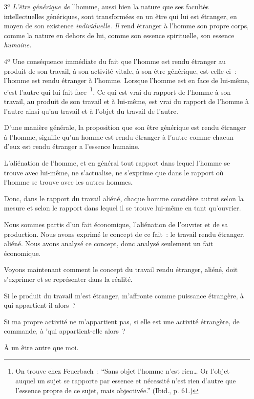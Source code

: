 \documentclass[french,twoside]{book} %
\begin{document}
3º \emph{L’être générique de} l’homme, aussi bien la nature que ses facultés intellectuelles génériques, sont transformées en un être qui lui est étranger, en moyen de son existence \emph{individuelle. Il} rend étranger à l’homme son propre corps, comme la nature en dehors de lui, comme son essence spirituelle, son essence \emph{humaine.}\par
4º Une conséquence immédiate du fait que l’homme est rendu étranger au produit de son travail, à son activité vitale, à son être générique, est celle-ci : l’homme est rendu étranger à l’homme. Lorsque l’homme est en face de lui-même, c’est l’autre qui lui fait face \footnote{On trouve chez Feuerbach : “Sans objet l’homme n’est rien… Or l’objet auquel un sujet se rapporte par essence et nécessité n’est rien d’autre que l’essence propre de ce sujet, mais objectivée.” (Ibid., p. 61.)}. Ce qui est vrai du rapport de l’homme à son travail, au produit de son travail et à lui-même, est vrai du rapport de l’homme à l’autre ainsi qu’au travail et à l’objet du travail de l’autre.\par
D’une manière générale, la proposition que son être générique est rendu étranger à l’homme, signifie qu’un homme est rendu étranger à l’autre comme chacun d’eux est rendu étranger a l’essence humaine.\par
L’aliénation de l’homme, et en général tout rapport dans lequel l’homme se trouve avec lui-même, ne s’actualise, ne s’exprime que dans le rapport où l’homme se trouve avec les autres hommes.\par
Donc, dans le rapport du travail aliéné, chaque homme considère autrui selon la mesure et selon le rapport dans lequel il se trouve lui-même en tant qu’ouvrier.\par
[XXV] Nous sommes partis d’un fait économique, l’aliénation de l’ouvrier et de sa production. Nous avons exprimé le concept de ce fait : le travail rendu étranger, aliéné. Nous avons analysé ce concept, donc analysé seulement un fait économique.\par
Voyons maintenant comment le concept du travail rendu étranger, aliéné, doit s’exprimer et se représenter dans la réalité.\par
Si le produit du travail m’est étranger, m’affronte comme puissance étrangère, à qui appartient-il alors ?\par
Si ma propre activité ne m’appartient pas, si elle est une activité étrangère, de commande, à 'qui appartient-elle alors ?\par
À un être autre que moi.\par
\end{document}
